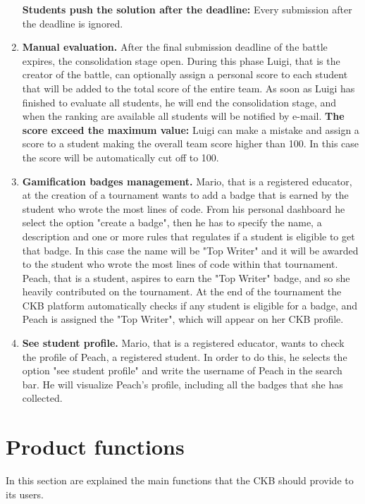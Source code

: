\begin{enumerate}[label=\textbf{SC.\arabic*}]
    \textbf{Students push the solution after the deadline:} Every submission after the deadline is ignored.
    \item {} \textbf{Manual evaluation.} \newline
    After the final submission deadline of the battle expires, the consolidation stage open. During this phase Luigi, that is the creator of the battle, can optionally assign a personal score to each student that will be added to the total score of the entire team.
    As soon as Luigi has finished to evaluate all students, he will end the consolidation stage, and when the ranking are available all students will be notified by e-mail.\newline
    \textbf{The score exceed the maximum value:} Luigi can make a mistake and assign a score to a student making the overall team score higher than 100. In this case the score will be automatically cut off to 100.
    \item {} \textbf{Gamification badges management.} \newline
    Mario, that is a registered educator, at the creation of a tournament wants to add a badge that is earned by the student who wrote the most lines of code. From his personal dashboard he select the option "create a badge", then he has to specify the name, a description and one or more rules that regulates if a student is eligible to get that badge. In this case the name will be "Top Writer" and it will be awarded to the student who wrote the most lines of code within that tournament. \newline
    Peach, that is a student, aspires to earn the "Top Writer" badge, and so she heavily contributed on the tournament. At the end of the tournament the CKB platform automatically checks if any student is eligible for a badge, and Peach is assigned the "Top Writer", which will appear on her CKB profile.
    \item {} \textbf{See student profile.} \newline
    Mario, that is a registered educator, wants to check the profile of Peach, a registered student. In order to do this, he selects the option "see student profile" and write the username of Peach in the search bar. He will visualize Peach's profile, including all the badges that she has collected.
\end{enumerate}
\clearpage

\section{Product functions}\label{desc:prodFunc}
In this section are explained the main functions that the CKB should provide to its users.
